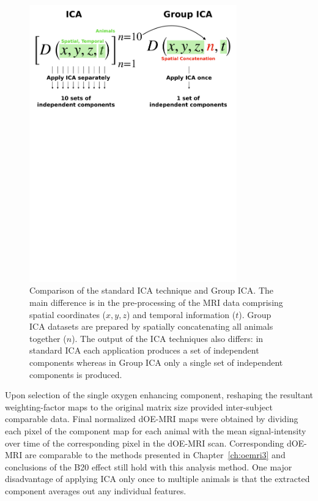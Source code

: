 \begin{figure}[htbp]
   \centering
   \includegraphics[width=0.8\textwidth]{futurework/futurework-images/groupICA_schematic.pdf} %
   \caption{Comparison of the standard ICA technique and Group ICA. The main difference is in the pre-processing of the MRI data comprising spatial coordinates ($x,y,z$) and temporal information ($t$). Group ICA datasets are prepared by spatially concatenating all animals together ($n$). The output of the ICA techniques also differs: in standard ICA each application produces a set of independent components whereas in Group ICA only a single set of independent components is produced.
   \label{groupICAschematic}}
\end{figure}

Upon selection of the single oxygen enhancing component, reshaping the resultant weighting-factor maps to the original matrix size provided inter-subject comparable data.
Final normalized \acs{dOE-MRI} maps were obtained by dividing each pixel of the component map for each animal with the mean signal-intensity over time of the corresponding pixel in the dOE-MRI scan.
Corresponding \acs{dOE-MRI} are comparable to the methods presented in Chapter~\ref{ch:oemri3} and conclusions of the B20 effect still hold with this analysis method.
One major disadvantage of applying \acs{ICA} only once to multiple animals is that the extracted component averages out any individual features.

